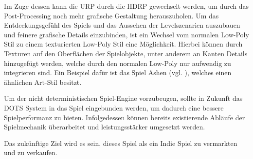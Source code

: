 Im Zuge dessen kann die \ac{URP} durch die \ac{HDRP} gewechselt werden, um durch das Post-Processing noch mehr grafische Gestaltung herauszuholen. Um das Entdeckungsgefühl des Spiels und das Aussehen der Levelszenarien auszubauen und feinere grafische Details einzubinden, ist ein Wechsel vom normalen Low-Poly Stil zu einem texturierten Low-Poly Stil eine Möglichkeit. Hierbei können durch Texturen auf den Oberflächen der Spielobjekte, unter anderem an Kanten Details hinzugefügt werden, welche durch den normalen Low-Poly nur aufwendig zu integrieren sind. Ein Beispiel dafür ist das Spiel Ashen (vgl. \cite{gamestar_ashen_2023}), welches einen ähnlichen Art-Stil besitzt.

Um der nicht deterministischen Spiel-Engine vorzubeugen, sollte in Zukunft das \ac{DOTS} System in das Spiel eingebunden werden, um dadurch eine bessere Spielperformanz zu bieten. Infolgedessen können bereits existierende Abläufe der Spielmechanik überarbeitet und leistungsstärker umgesetzt werden.

Das zukünftige Ziel wird es sein, dieses Spiel als ein Indie Spiel zu vermarkten und zu verkaufen.
